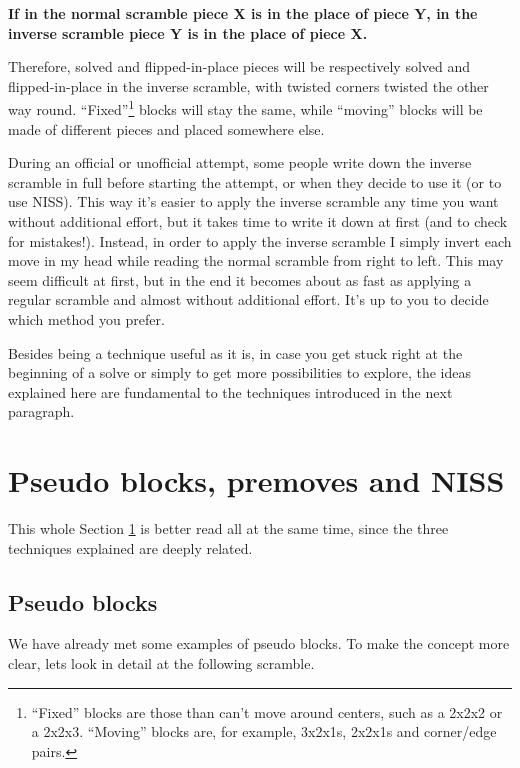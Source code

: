 \documentclass[11pt,a4paper]{book}
\begin{document}
\begin{framed}
\textbf{If in the normal scramble piece X is in the place of piece Y, in the inverse scramble piece Y is in the place of piece X.}
\end{framed}

Therefore, solved and flipped-in-place pieces will be respectively solved and flipped-in-place in the inverse scramble, with twisted corners twisted the other way round. ``Fixed''\footnote{``Fixed'' blocks are those than can't move around centers, such as a 2x2x2 or a 2x2x3. ``Moving'' blocks are, for example, 3x2x1s, 2x2x1s and corner/edge pairs.} blocks will stay the same, while ``moving'' blocks will be made of different pieces and placed somewhere else.

During an official or unofficial attempt, some people write down the inverse scramble in full before starting the attempt, or when they decide to use it (or to use NISS). This way it's easier to apply the inverse scramble any time you want without additional effort, but it takes time to write it down at first (and to check for mistakes!). Instead, in order to apply the inverse scramble I simply invert each move in my head while reading the normal scramble from right to left. This may seem difficult at first, but in the end it becomes about as fast as applying a regular scramble and almost without additional effort. It's up to you to decide which method you prefer.

Besides being a technique useful as it is, in case you get stuck right at the beginning of a solve or simply to get more possibilities to explore, the ideas explained here are fundamental to the techniques introduced in the next paragraph.

\section{Pseudo blocks, premoves and NISS}
\label{pb-p-niss}

This whole Section \ref{pb-p-niss} is better read all at the same time, since the three techniques explained are deeply related.

\subsection{Pseudo blocks}

We have already met some examples of pseudo blocks. To make the concept more clear, lets look in detail at the following scramble.
\end{document}
